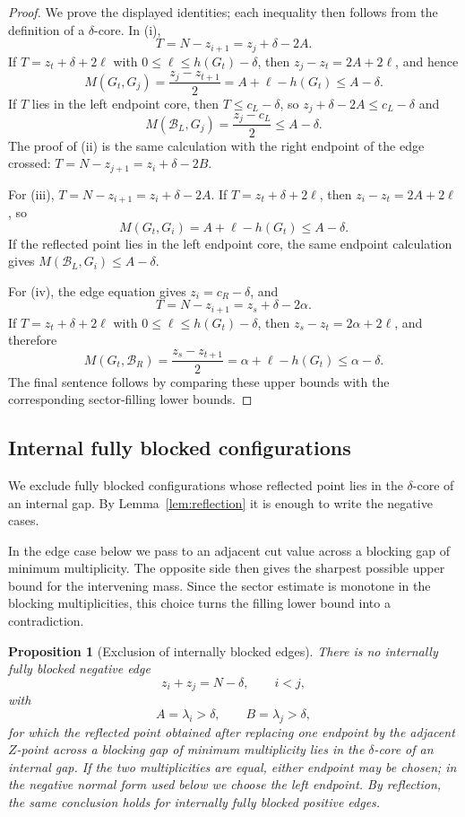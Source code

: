 \documentclass[11pt]{article}
\newtheorem{proposition}[theorem]{Proposition}
\begin{document}
\begin{proof}
We prove the displayed identities; each inequality then follows from the definition of a $\delta$-core.  In (i),
\[
        T=N-z_{i+1}=z_j+\delta-2A.
\]
If $T=z_t+\delta+2\ell$ with $0\le\ell\le h(G_t)-\delta$, then $z_j-z_t=2A+2\ell$, and hence
\[
        M(G_t,G_j)
        =\frac{z_j-z_{t+1}}2
        =A+\ell-h(G_t)
        \le A-\delta.
\]
If $T$ lies in the left endpoint core, then $T\le c_L-\delta$, so $z_j+\delta-2A\le c_L-\delta$ and
\[
        M(\mathcal B_L,G_j)=\frac{z_j-c_L}{2}\le A-\delta.
\]
The proof of (ii) is the same calculation with the right endpoint of the edge crossed: $T=N-z_{j+1}=z_i+\delta-2B$.

For (iii), $T=N-z_{i+1}=z_i+\delta-2A$.  If $T=z_t+\delta+2\ell$, then $z_i-z_t=2A+2\ell$, so
\[
        M(G_t,G_i)=A+\ell-h(G_t)\le A-\delta.
\]
If the reflected point lies in the left endpoint core, the same endpoint calculation gives $M(\mathcal B_L,G_i)\le A-\delta$.

For (iv), the edge equation gives $z_i=c_R-\delta$, and
\[
        T=N-z_{i+1}=z_s+\delta-2\alpha.
\]
If $T=z_t+\delta+2\ell$ with $0\le\ell\le h(G_t)-\delta$, then $z_s-z_t=2\alpha+2\ell$, and therefore
\[
        M(G_t,\mathcal B_R)
        =\frac{z_s-z_{t+1}}2
        =\alpha+\ell-h(G_t)
        \le\alpha-\delta.
\]
The final sentence follows by comparing these upper bounds with the corresponding sector-filling lower bounds.
\end{proof}

\subsection{Internal fully blocked configurations}

We exclude fully blocked configurations whose reflected point lies in the $\delta$-core of an internal gap.  By Lemma~\ref{lem:reflection} it is enough to write the negative cases.

In the edge case below we pass to an adjacent cut value across a blocking gap of minimum multiplicity.  The opposite side then gives the sharpest possible upper bound for the intervening mass.  Since the sector estimate is monotone in the blocking multiplicities, this choice turns the filling lower bound into a contradiction.

\begin{proposition}[Exclusion of internally blocked edges]\label{prop:internal-edge}
There is no internally fully blocked negative edge
\[
        z_i+z_j=N-\delta,
        \qquad i<j,
\]
with
\[
        A=\lambda_i>\delta,
        \qquad
        B=\lambda_j>\delta,
\]
for which the reflected point obtained after replacing one endpoint by the adjacent $Z$-point across a blocking gap of minimum multiplicity lies in the $\delta$-core of an internal gap.  If the two multiplicities are equal, either endpoint may be chosen; in the negative normal form used below we choose the left endpoint.  By reflection, the same conclusion holds for internally fully blocked positive edges.
\end{proposition}
\end{document}
